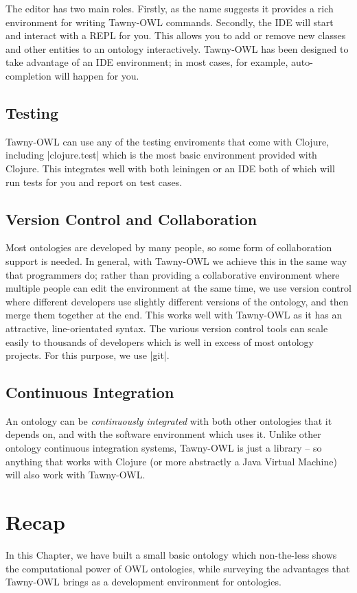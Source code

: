 The editor has two main roles. Firstly, as the name suggests it provides
a rich environment for writing Tawny-OWL commands. Secondly, the IDE
will start and interact with a REPL for you. This allows you to add or
remove new classes and other entities to an ontology interactively.
Tawny-OWL has been designed to take advantage of an IDE environment; in
most cases, for example, auto-completion will happen for you.

\subsection{Testing}
\label{sec:testing}

Tawny-OWL can use any of the testing enviroments that come with Clojure,
including |clojure.test| which is the most basic environment provided with
Clojure. This integrates well with both leiningen or an IDE both of which will
run tests for you and report on test cases.

\subsection{Version Control and Collaboration}
\label{sec:vers-contr-coll}

Most ontologies are developed by many people, so some form of collaboration
support is needed. In general, with Tawny-OWL we achieve this in the same way
that programmers do; rather than providing a collaborative environment where
multiple people can edit the environment at the same time, we use version
control where different developers use slightly different versions of the
ontology, and then merge them together at the end. This works well with
Tawny-OWL as it has an attractive, line-orientated syntax. The various version
control tools can scale easily to thousands of developers which is well in
excess of most ontology projects. For this purpose, we use |git|.

\subsection{Continuous Integration}
\label{sec:cont-integr}

An ontology can be \emph{continuously integrated} with both other ontologies
that it depends on, and with the software environment which uses it. Unlike
other ontology continuous integration systems, Tawny-OWL is just a library --
so anything that works with Clojure (or more abstractly a Java Virtual
Machine) will also work with Tawny-OWL.

\section{Recap}
\label{sec:recap}

In this Chapter, we have built a small basic ontology which non-the-less shows
the computational power of OWL ontologies, while surveying the advantages that
Tawny-OWL brings as a development environment for ontologies.



